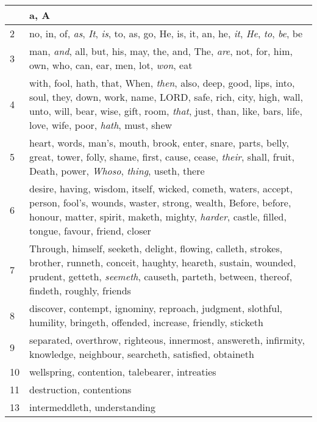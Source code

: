 \begin{center}
\begin{longtable}{l|p{3.75in}}
\hline \hline 
\endlastfoot 
1 & a, A\\ \hline 
2 & no, in, of, \emph{as}, \emph{It}, \emph{is}, to, as, go, He, is, it, an, he, \emph{it}, \emph{He}, \emph{to}, \emph{be}, be\\ \hline 
3 & man, \emph{and}, all, but, his, may, the, and, The, \emph{are}, not, for, him, own, who, can, ear, men, lot, \emph{won}, eat\\ \hline 
4 & with, fool, hath, that, When, \emph{then}, also, deep, good, lips, into, soul, they, down, work, name, LORD, safe, rich, city, high, wall, unto, will, bear, wise, gift, room, \emph{that}, just, than, like, bars, life, love, wife, poor, \emph{hath}, must, shew\\ \hline 
5 & heart, words, man's, mouth, brook, enter, snare, parts, belly, great, tower, folly, shame, first, cause, cease, \emph{their}, shall, fruit, Death, power, \emph{Whoso}, \emph{thing}, useth, there\\ \hline 
6 & desire, having, wisdom, itself, wicked, cometh, waters, accept, person, fool's, wounds, waster, strong, wealth, Before, before, honour, matter, spirit, maketh, mighty, \emph{harder}, castle, filled, tongue, favour, friend, closer\\ \hline 
7 & Through, himself, seeketh, delight, flowing, calleth, strokes, brother, runneth, conceit, haughty, heareth, sustain, wounded, prudent, getteth, \emph{seemeth}, causeth, parteth, between, thereof, findeth, roughly, friends\\ \hline 
8 & discover, contempt, ignominy, reproach, judgment, slothful, humility, bringeth, offended, increase, friendly, sticketh\\ \hline 
9 & separated, overthrow, righteous, innermost, answereth, infirmity, knowledge, neighbour, searcheth, satisfied, obtaineth\\ \hline 
10 & wellspring, contention, talebearer, intreaties\\ \hline 
11 & destruction, contentions\\ \hline 
13 & intermeddleth, understanding\\ \hline 
\end{longtable} 
\end{center} 




 
